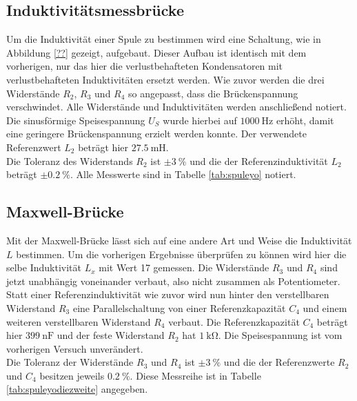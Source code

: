 \subsection{Induktivitätsmessbrücke}
\label{sec:spuleman}
Um die Induktivität einer Spule zu bestimmen wird eine Schaltung, wie in Abbildung \ref{??} gezeigt, aufgebaut. Dieser Aufbau ist identisch mit dem vorherigen, nur das hier die verlustbehafteten Kondensatoren mit verlustbehafteten Induktivitäten
ersetzt werden. Wie zuvor werden die drei Widerstände $R_{2}$, $R_{3}$ und $R_{4}$ so angepasst, dass die Brückenspannung verschwindet. Alle Widerstände und Induktivitäten werden anschließend notiert. Die sinusförmige Speisespannung $U_{S}$
wurde hierbei auf $\SI{1000}{\hertz}$ erhöht, damit eine geringere Brückenspannung erzielt werden konnte.
Der verwendete Referenzwert $L_{2}$ beträgt hier $\SI{27.5}{\milli\henry}$. 
\\
\newline
Die Toleranz des Widerstands $R_{2}$ ist $\pm\SI{3}{\percent}$ und die der Referenzinduktivität $L_{2}$ beträgt $\pm\SI{0.2}{\percent}$.
Alle Messwerte sind in Tabelle \ref{tab:spuleyo} notiert.

\subsection{Maxwell-Brücke}
Mit der Maxwell-Brücke lässt sich auf eine andere Art und Weise die Induktivität $L$ bestimmen. Um die vorherigen Ergebnisse überprüfen zu können wird hier die selbe Induktivität $L_{x}$ mit Wert 17 gemessen. Die Widerstände $R_{3}$ und $R_{4}$ sind
jetzt unabhängig voneinander verbaut, also nicht zusammen als Potentiometer. Statt einer Referenzinduktivität wie zuvor wird nun hinter den verstellbaren Widerstand $R_{3}$ eine Parallelschaltung von einer Referenzkapazität $C_{4}$ und einem 
weiteren verstellbaren Widerstand $R_{4}$ verbaut. Die Referenzkapazität $C_{4}$ beträgt hier $\SI{399}{\nano\farad}$ und der feste Widerstand $R_{2}$ hat $\SI{1}{\kilo\ohm}$. Die Speisespannung ist vom vorherigen Versuch unverändert.
\\
\newline
Die Toleranz der Widerstände $R_{3}$ und $R_{4}$ ist $\pm\SI{3}{\percent}$ und die der Referenzwerte $R_{2}$ und $C_{4}$ besitzen jeweils $\SI{0.2}{\percent}$.
Diese Messreihe ist in Tabelle \ref{tab:spuleyodiezweite} angegeben.

